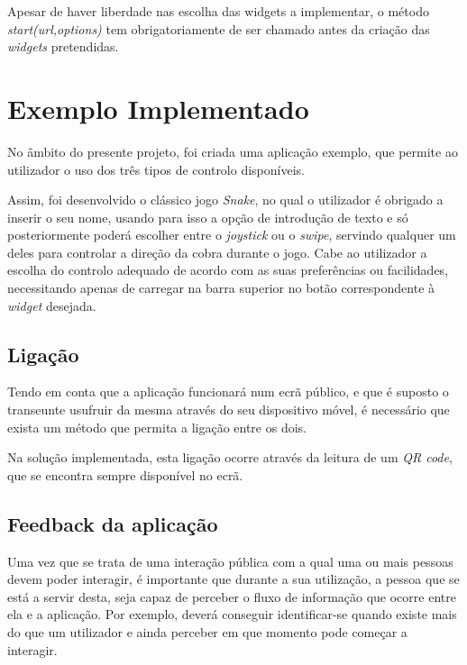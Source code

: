	Apesar de haver liberdade nas escolha das widgets a implementar, o método \textit{start(url,options)} tem obrigatoriamente de ser chamado antes da criação das \textit{widgets} pretendidas.



\section{Exemplo Implementado} \label{sec:exemplo}

	No âmbito do presente projeto, foi criada uma aplicação exemplo, que permite ao utilizador o uso dos três tipos de controlo disponíveis.

	Assim, foi desenvolvido o clássico jogo \textit{Snake}, no qual o utilizador é obrigado a inserir o seu nome, usando para isso a opção de introdução de texto e só posteriormente poderá escolher entre o \textit{joystick} ou o \textit{swipe}, servindo qualquer um deles para controlar a direção da cobra durante o jogo. Cabe ao utilizador a escolha do controlo adequado de acordo com as suas preferências ou facilidades, necessitando apenas de carregar na barra superior no botão correspondente à \textit{widget} desejada.

	\subsection{Ligação}

	Tendo em conta que a aplicação funcionará num ecrã público, e que é suposto o transeunte usufruir da mesma através do seu dispositivo móvel, é necessário que exista um método que permita a ligação entre os dois.

	Na solução implementada, esta ligação ocorre através da leitura de um \textit{QR code}, que se encontra sempre disponível no ecrã.

	\subsection{Feedback da aplicação}

	Uma vez que se trata de uma interação pública com a qual uma ou mais pessoas devem poder interagir, é importante que durante a sua utilização, a pessoa que se está a servir desta, seja capaz de perceber o fluxo de informação que ocorre entre ela e a aplicação. Por exemplo, deverá conseguir identificar-se quando existe mais do que um utilizador e ainda perceber em que momento pode começar a interagir.

